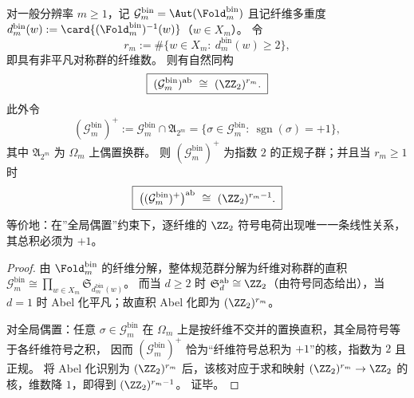 \begin{enumerate}
  \begin{theorem}\label{thm:window6-foldbin-gauge-abelianization-even-parity}
  对一般分辨率 \(m\ge 1\)，记
  \(\mathcal{G}^{\mathrm{bin}}_m=\Aut(\Fold^{\mathrm{bin}}_m)\)
  且记纤维多重度 \(d^{\mathrm{bin}}_m(w):=\card{(\Fold^{\mathrm{bin}}_m)^{-1}(w)}\)（\(w\in X_m\)）。
  令
  \[
  r_m:=\#\{w\in X_m:\ d^{\mathrm{bin}}_m(w)\ge 2\},
  \]
  即具有非平凡对称群的纤维数。
  则有自然同构
  \[
  \boxed{\;(\mathcal{G}^{\mathrm{bin}}_m)^{\mathrm{ab}}\ \cong\ (\ZZ_2)^{r_m}.\;}
  \]
  此外令
  \[
  (\mathcal{G}^{\mathrm{bin}}_m)^{+}
  :=\mathcal{G}^{\mathrm{bin}}_m\cap \mathfrak{A}_{2^m}
  =\{\sigma\in\mathcal{G}^{\mathrm{bin}}_m:\ \operatorname{sgn}(\sigma)=+1\},
  \]
  其中 \(\mathfrak{A}_{2^m}\) 为 \(\Omega_m\) 上偶置换群。
  则 \((\mathcal{G}^{\mathrm{bin}}_m)^{+}\) 为指数 \(2\) 的正规子群；并且当 \(r_m\ge 1\) 时
  \[
  \boxed{\;\bigl((\mathcal{G}^{\mathrm{bin}}_m)^{+}\bigr)^{\mathrm{ab}}\ \cong\ (\ZZ_2)^{r_m-1}.\;}
  \]
  等价地：在”全局偶置”约束下，逐纤维的 \(\ZZ_2\) 符号电荷出现唯一一条线性关系，其总积必须为 \(+1\)。
  \end{theorem}

  \begin{proof}
  由 \(\Fold^{\mathrm{bin}}_m\) 的纤维分解，整体规范群分解为纤维对称群的直积
  \(
  \mathcal{G}^{\mathrm{bin}}_m\cong \prod_{w\in X_m}\mathfrak{S}_{d^{\mathrm{bin}}_m(w)}
  \)。
  而当 \(d\ge 2\) 时 \(\mathfrak{S}_d^{\mathrm{ab}}\cong \ZZ_2\)（由符号同态给出），当 \(d=1\) 时 Abel 化平凡；故直积 Abel 化即为 \((\ZZ_2)^{r_m}\)。
  \par
  对全局偶置：任意 \(\sigma\in\mathcal{G}^{\mathrm{bin}}_m\) 在 \(\Omega_m\) 上是按纤维不交并的置换直积，其全局符号等于各纤维符号之积，
  因而 \((\mathcal{G}^{\mathrm{bin}}_m)^{+}\) 恰为“纤维符号总积为 \(+1\)”的核，指数为 \(2\) 且正规。
  将 Abel 化识别为 \((\ZZ_2)^{r_m}\) 后，该核对应于求和映射 \((\ZZ_2)^{r_m}\to\ZZ_2\) 的核，维数降 \(1\)，即得到 \((\ZZ_2)^{r_m-1}\)。
  证毕。
  \end{proof}

  
  
  
  
  
  


\end{enumerate}
